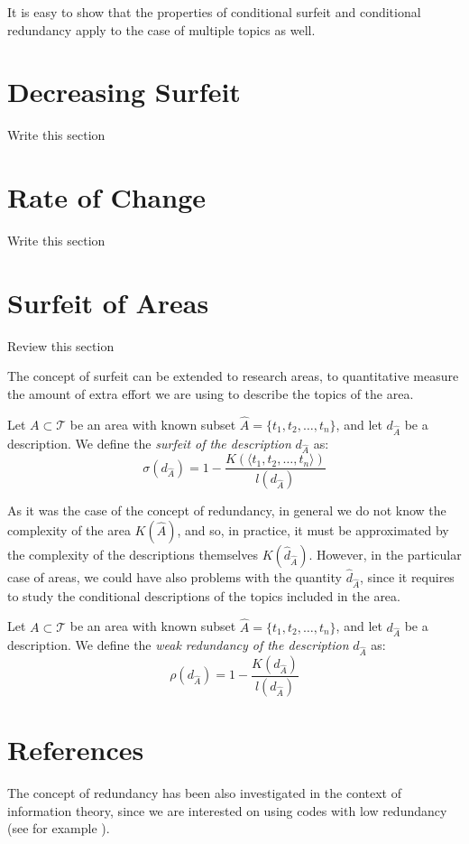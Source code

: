 It is easy to show that the properties of conditional surfeit and conditional redundancy apply to the case of multiple topics as well.

%
%

\section{Decreasing Surfeit}

{\color{red} Write this section}

%
%

\section{Rate of Change}

{\color{red} Write this section}


%
%

\section{Surfeit of Areas}

{\color{red} Review this section}

The concept of surfeit can be extended to research areas, to quantitative measure the amount of extra effort we are using to describe the topics of the area.

\begin{definition}
Let $A \subset \mathcal{T}$ be an area with known subset $\hat{A} = \{t_1, t_2, \ldots, t_n\}$, and let $d_{\hat{A}}$ be a description. We define the \emph{surfeit of the description} $d_{\hat{A}}$ as:
\[
\sigma \left( d_{\hat{A}} \right) = 1  - \frac{K( \langle t_1, t_2, \ldots, t_n \rangle )}{l \left( d_{\hat{A}} \right)}
\]
\end{definition}

As it was the case of the concept of redundancy, in general we do not know the complexity of the area $K(\hat{A})$, and so, in practice, it must be approximated by the complexity of the descriptions themselves $K(\hat{d}_{\hat{A}})$. However, in the particular case of areas, we could have also problems with the quantity $\hat{d}_{\hat{A}}$, since it requires to study the conditional descriptions of the topics included in the area.

\begin{definition}
Let $A \subset \mathcal{T}$ be an area with known subset $\hat{A} = \{t_1, t_2, \ldots, t_n\}$, and let $d_{\hat{A}}$ be a description. We define the \emph{weak redundancy of the description} $d_{\hat{A}}$ as:
\[
\rho(d_{\hat{A}}) =  1  - \frac{K \left( d_{\hat{A}} \right)}{l \left( d_{\hat{A}} \right)}
\]
\end{definition}

%
%

\section*{References}

The concept of redundancy has been also investigated in the context of information theory, since we are interested on using codes with low redundancy (see for example \cite{abramson1963information}).

